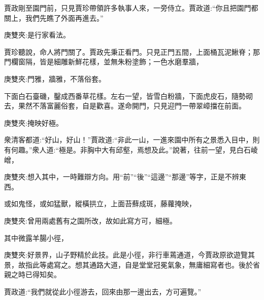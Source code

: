 \begin{parag}
    賈政剛至園門前，只見賈珍帶領許多執事人來，一旁侍立。賈政道:“你且把園門都關上，我們先瞧了外面再進去。”\begin{note}庚雙夾:是行家看法。\end{note}賈珍聽說，命人將門關了。賈政先秉正看門。只見正門五間，上面桶瓦泥鰍脊；那門欄窗隔，皆是細雕新鮮花樣，並無朱粉塗飾；一色水磨羣牆，\begin{note}庚雙夾:門雅，牆雅，不落俗套。\end{note}下面白石臺磯，鑿成西番草花樣。左右一望，皆雪白粉牆，下面虎皮石，隨勢砌去，果然不落富麗俗套，自是歡喜。遂命開門，只見迎門一帶翠嶂擋在前面。\begin{note}庚雙夾:掩映好極。\end{note}衆清客都道:“好山，好山！”賈政道:“非此一山，一進來園中所有之景悉入目中，則有何趣。”衆人道:“極是。非胸中大有邱壑，焉想及此。”說著，往前一望，見白石崚嶒，\begin{note}庚雙夾:想入其中，一時難辯方向。用“前”“後”“這邊”“那邊”等字，正是不辨東西。\end{note}或如鬼怪，或如猛獸，縱橫拱立，上面苔蘚成斑，藤蘿掩映，\begin{note}庚雙夾:曾用兩處舊有之園所改，故如此寫方可，細極。\end{note}其中微露羊腸小徑，\begin{note}庚雙夾:好景界，山子野精於此技。此是小徑，非行車蔫通道，今賈政原欲遊覽其景，故指此等處寫之。想其通路大道，自是堂堂冠冕氣象，無庸細寫者也。後於省親之時已得知矣。\end{note}賈政道:“我們就從此小徑游去，回來由那一邊出去，方可遍覽。”
\end{parag}



